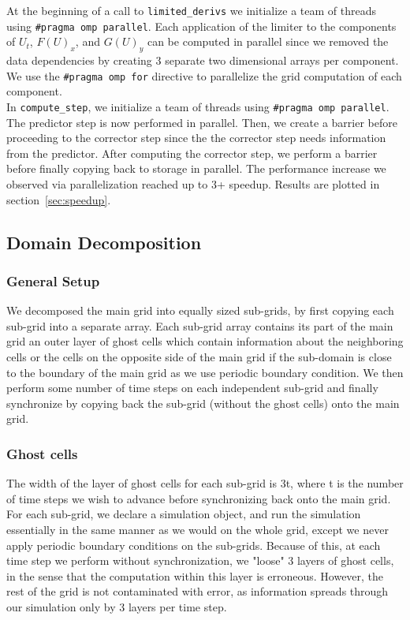 \documentclass[11pt]{article}
\begin{document}
At the beginning of a call to \texttt{limited\_derivs} we initialize a team of threads using \texttt{\#pragma omp parallel}. Each application of the limiter to the components of $U_t$, $F(U)_x$, and $G(U)_y$ can be computed in parallel since we removed the data dependencies by creating 3 separate two dimensional arrays per component. We use the \texttt{\#pragma omp for} directive to parallelize the grid computation of each component. \\

In \texttt{compute\_step}, we initialize a team of threads using \texttt{\#pragma omp parallel}. The predictor step is now performed in parallel. Then, we create a barrier before proceeding to the corrector step since the the corrector step needs information from the predictor. After computing the corrector step, we perform a barrier before finally copying back to storage in parallel. The performance increase we observed via parallelization reached up to 3+ speedup. Results are plotted in section~\ref{sec:speedup}.


\subsection{Domain Decomposition}
\subsubsection{General Setup}
We decomposed the main grid into equally sized sub-grids, by first copying  each sub-grid into a separate array. Each sub-grid array contains its part of the main grid an outer layer of ghost cells which contain information about the neighboring cells or the cells on the opposite side of the main grid if the sub-domain is close to the boundary of the main grid as we use periodic boundary condition. We then perform some number of time steps on each independent sub-grid and finally synchronize by copying back the sub-grid (without the ghost cells) onto the main grid. 
\subsubsection{Ghost cells}

 The width of the layer of ghost cells for each sub-grid is 3t, where t is the number of time steps we wish to advance before synchronizing back onto the main grid. For each sub-grid, we declare a simulation object, and run the simulation essentially in the same manner as we would on the whole grid, except we never apply periodic boundary conditions on the sub-grids. Because of this, at each time step we perform without synchronization, we "loose" 3 layers of ghost cells, in the sense that the computation within this layer is erroneous. 
However, the rest of the grid is not contaminated with error, as information spreads through our simulation only by 3 layers per time step.
\end{document}

